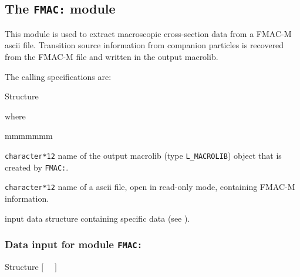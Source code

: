 \subsection{The {\tt FMAC:} module}\label{sect:FMACData}

This module is used to extract macroscopic cross-section data from a FMAC-M {\sc ascii} file.
Transition source information from companion particles is recovered from the FMAC-M file and written in the
output {\sc macrolib}.

\vskip 0.02cm

The calling specifications are:

\begin{DataStructure}{Structure }
~\moc{:=}~~~\moc{::}~ \\
\end{DataStructure}

\noindent where
\begin{ListeDeDescription}{mmmmmmm}

\item[\dusa{MACRO}] {\tt character*12} name of the output {\sc macrolib} (type {\tt L\_MACROLIB}) object that is created by {\tt FMAC:}.

\item[\dusa{fmac.txt}] {\tt character*12} name of a {\sc ascii} file, open in read-only mode, containing FMAC-M information.

\item[\dusa{FMAC\_data}] input data structure containing specific data (see ).

\end{ListeDeDescription}

\subsubsection{Data input for module {\tt FMAC:}}\label{sect:descFMAC}

\vskip -0.5cm

\begin{DataStructure}{Structure }
$[$~ ~$]$ \\
  \\
\moc{;}
\end{DataStructure}

